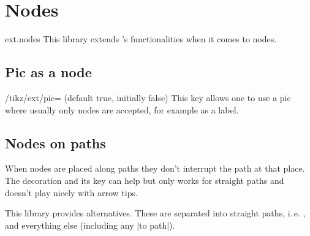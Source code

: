 %
%
%

\section{Nodes}
\begin{tikzlibrary}{ext.nodes}
This library extends \tikzname's functionalities when it comes to nodes.
\end{tikzlibrary}

\begin{multicols}{2}

\subsection{Pic as a node}
\begin{key}{/tikz/ext/pic= (default true, initially false)}
This key allows one to use a pic where usually only nodes are accepted,
for example as a label.
\begin{codeexample}[preamble=\usetikzlibrary{ext.nodes, ext.misc}]
\begin{tikzpicture}[
  slsl/.pic={\draw(-2pt, 1.5pt)--( 2pt, .5pt)
                  ( 2pt,-1.5pt)--(-2pt,-.5pt);}]
\node[
  draw, minimum width=3cm, minimum height=1cm,
  label={[ext/pic            ] east:slsl},
  label={[ext/pic, rotate= 90]north:slsl},
  label={[ext/pic            ] west:slsl},
  label={[ext/pic, rotate=-90]south:slsl}]{};
\end{tikzpicture}
\end{codeexample}
\end{key}

\subsection{Nodes on paths}
When nodes are placed along paths they don't interrupt
the path at that place.
The decoration 
and its 
key can help but only works for straight paths and
doesn't play nicely with arrow tips.

This library provides alternatives.
These are separated into straight paths, i.\,e. ,
and everything else (including any |to path|).


\end{multicols}
